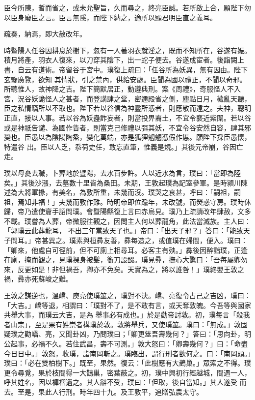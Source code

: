 \begin{pinyinscope}
 臣今所陳，暫而省之，或未允聖旨，久而尋之，終亮臣誠。若所啟上合，願陛下勿以臣身廢臣之言。臣言無隱，而陛下納之，適所以顯君明臣直之義耳。



 疏奏，納焉，即大赦改年。



 時暨陽人任谷因耕息於樹下，忽有一人著羽衣就淫之，既而不知所在，谷遂有娠。積月將產，羽衣人復來，以刀穿其陰下，出一蛇子便去。谷遂成宦者。後詣闕上書，自云有道術。帝留谷于宮中。璞復上疏曰：「任谷所為妖異，無有因由。陛下玄鑒廣覽，欲知
 其情狀，引之禁內，供給安處。臣聞為國以禮正，不聞以奇邪。所聽惟人，故神降之吉。陛下簡默居正，動遵典刑。案《周禮》，奇服怪人不入宮，況谷妖詭怪人之甚者，而登講肆之堂，密邇殿省之側，塵點日月，穢亂天聽，臣之私情竊所以不取也。陛下若以谷信為神靈所憑者，則應敬而遠之。夫神，聰明正直，接以人事。若以谷為妖蠱詐妄者，則當投畀裔土，不宜令褻近紫闈。若以谷或是神祇告譴、為國作眚者，則當克己修禮以弭其妖，不宜令谷安然自容，肆其邪變也。臣愚以為陰陽陶烝，變化萬端，亦是狐狸魍魎憑假作慝。願陛下採臣愚懷，特遣谷
 出。臣以人乏，忝荷史任，敢忘直筆，惟義是規。」其後元帝崩，谷因亡走。



 璞以母憂去職，卜葬地於暨陽，去水百步許。人以近水為言，璞曰：「當即為陸矣。」其後沙漲，去墓數十里皆為桑田。未期，王敦起璞為記室參軍。是時潁川陳述為大將軍掾，有美名，為敦所重，未幾而沒。璞哭之哀甚，呼曰：「嗣祖，嗣祖，焉知非福！」夫幾而敦作難。時明帝即位踰年，未改號，而熒惑守房。璞時休歸，帝乃遣使齎手詔問璞。會暨陽縣復上言曰赤烏見。璞乃上疏請改年肆赦，文多不載。璞嘗為人葬，帝微服往觀之，因問主人何以葬龍角，此法當滅族。主人曰：「郭璞云此葬龍耳，
 不出三年當致天子也。」帝曰：「出天子邪？」答曰：「能致天子問耳。」帝甚異之。璞素與桓彞友善，彞每造之，或值璞在婦間，便入。璞曰：「卿來，他處自可徑前，但不可廁上相尋耳。必客主有殃。」彞後因醉詣璞，正逢在廁，掩而觀之，見璞裸身被髮，銜刀設醊。璞見彞，撫心大驚曰：「吾每屬卿勿來，反更如是！非但禍吾，卿亦不免矣。天實為之，將以誰咎！」璞終嬰王敦之禍，彞亦死蘇峻之難。



 王敦之謀逆也，溫嶠、庾亮使璞筮之，璞對不決。嶠、亮復令占己之吉凶，璞曰：「大吉。」嶠等退，相謂曰：「璞對不了，是不敢有言，或天奪敦魄。今吾等與國家共舉大事，而璞云大吉，是為
 舉事必有成也。」於是勸帝討敦。初，璞每言「殺我者山宗」，至是果有姓崇者構璞於敦。敦將舉兵，又使璞筮。璞曰：「無成。」敦固疑璞之勸嶠、亮，又聞卦凶，乃問璞曰；「卿更筮吾壽幾何？」答曰：「思向卦，明公起事，必禍不久。若住武昌，壽不可測。」敦大怒曰：「卿壽幾何？」曰：「命盡今日日中。」敦怒，收璞，詣南岡斬之。璞臨出，謂行刑者欲何之。曰：「南岡頭。」璞曰：「必在雙柏樹下。」既至，果然。復云：「此樹應有大鵲巢。」眾索之不得。璞更令尋覓，果於枝間得一大鵲巢，密葉蔽之。初，璞中興初行經越城，間遇一人，呼其姓名，因以褲褶遺之。其人辭不受，璞曰：「但取，後自當知。」其人遂受
 而去。至是，果此人行刑。時年四十九。及王敦平，追贈弘農太守。




\end{pinyinscope}
